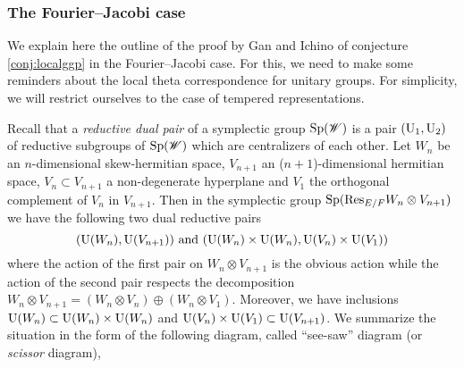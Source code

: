 \subsubsection{The Fourier--Jacobi case}

We explain here the outline of the proof by Gan and Ichino \cite{gan2016gross} of conjecture \ref{conj:localggp} in the Fourier--Jacobi case.
For this, we need to make some reminders about the local theta correspondence for unitary groups.
For simplicity, we will restrict ourselves to the case of tempered representations.


Recall that a \emph{reductive dual pair} of a symplectic group $\mathrm{Sp}(\mathscr{W})$ is a pair $(\mathrm{U}_1, \mathrm{U}_2)$ of reductive subgroups of $\mathrm{Sp}(\mathscr{W})$ which are centralizers of each other.
Let $W_n$ be an $n$-dimensional skew-hermitian space, $V_{n+1}$ an ($n+1$)-dimensional hermitian space, $V_n \subset V_{n+1}$ a non-degenerate hyperplane and $V_1$ the orthogonal complement of $V_n$ in $V_{n+1}$.
Then in the symplectic group $\mathrm{Sp}(\mathrm{Res}_{E/F} W_n \otimes V_{n+1})$ we have the following two dual reductive pairs
\[
    (\mathrm{U}(W_n), \mathrm{U}(V_{n+1}))\text{ and } (\mathrm{U}(W_n) \times \mathrm{U}(W_{n}), \mathrm{U}(V_n) \times \mathrm{U}(V_{1}))
\]
where the action of the first pair on $W_n \otimes V_{n+1}$ is the obvious action while the action of the second pair respects the decomposition $W_n \otimes V_{n+1} = (W_n \otimes V_n) \oplus (W_n \otimes V_1)$.
Moreover, we have inclusions $\mathrm{U}(W_n) \subset \mathrm{U}(W_n) \times \mathrm{U}(W_n)$ and $\mathrm{U}(V_n) \times \mathrm{U}(V_1) \subset \mathrm{U}(V_{n+1})$.
We summarize the situation in the form of the following diagram, called ``see-saw'' diagram (or \emph{scissor} diagram),

